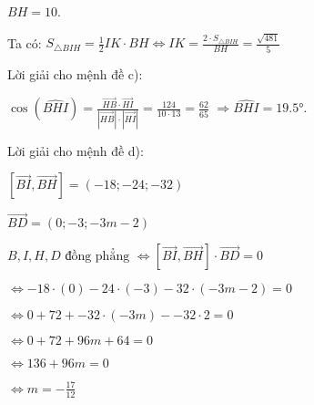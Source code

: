 \documentclass[a4paper,12pt]{article}
\begin{document}
\(BH = 10\).

Ta có: \({}S_{\triangle BIH} = \frac{1}{2} IK \cdot BH \Leftrightarrow IK = \frac{2 \cdot S_{\triangle BIH}}{BH} = \frac{\sqrt{481}}{5}\)

Lời giải cho mệnh đề c):

\( \cos(\widehat{BHI}) = \frac{\overrightarrow{HB} \cdot \overrightarrow{HI}}{|\overrightarrow{HB}| \cdot |\overrightarrow{HI}|} = \frac{124}{10 \cdot 13} = \frac{62}{65} \) \( \Rightarrow \widehat{BHI} = 19.5° \).

Lời giải cho mệnh đề d):

\([\overrightarrow{BI}, \overrightarrow{BH}] = (-18; -24; -32)\)

\(\overrightarrow{BD} = (0; -3; -3m - 2)\)

\(B, I, H, D \text{ đồng phẳng } \Leftrightarrow [\overrightarrow{BI}, \overrightarrow{BH}] \cdot \overrightarrow{BD} = 0\)

\(\Leftrightarrow -18 \cdot (0) - 24 \cdot (-3) - 32 \cdot (-3m - 2) = 0\)

\(\Leftrightarrow 0 + 72 + -32 \cdot (-3m) - -32 \cdot 2 = 0\)

\(\Leftrightarrow 0 + 72 + 96m + 64 = 0\)

\(\Leftrightarrow 136 + 96m = 0\)

\(\Leftrightarrow m = -\frac{17}{12}\)
\end{document}
